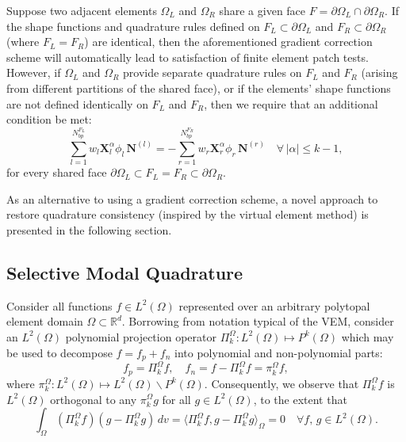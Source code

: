     	Suppose two adjacent elements $\Omega_{L}$ and $\Omega_{R}$ share a given face $F = \partial \Omega_{L} \cap \partial \Omega_{R}$. If the shape functions and quadrature rules defined on $F_L \subset \partial \Omega_L$ and $F_R \subset \partial \Omega_R$ (where $F_L = F_R$) are identical, then the aforementioned gradient correction scheme will automatically lead to satisfaction of finite element patch tests. However, if $\Omega_{L}$ and $\Omega_{R}$ provide separate quadrature rules on $F_L$ and $F_R$ (arising from different partitions of the shared face), or if the elements' shape functions are not defined identically on $F_L$ and $F_R$, then we require that an additional condition be met:
    	\begin{equation}
    		\sum_{l=1}^{N^{F_L}_{bp}} w_l \mathbf{X}^{\alpha}_l \phi_l \, \mathbf{N}^{(l)} = - \sum_{r=1}^{N^{F_R}_{bp}} w_r \mathbf{X}^{\alpha}_r \phi_r \, \mathbf{N}^{(r)} \quad \forall \, | \alpha | \leq k-1,
    	\end{equation}
    	for every shared face $\partial \Omega_L \subset F_L = F_R \subset \partial \Omega_R$.
		
	 As an alternative to using a gradient correction scheme, a novel approach to restore quadrature consistency (inspired by the virtual element method) is presented in the following section.
		
	\subsection*{Selective Modal Quadrature}
	
	Consider all functions $f \in L^2 (\Omega)$ represented over an arbitrary polytopal element domain $\Omega \subset \mathbb{R}^d$. Borrowing from notation typical of the VEM, consider an $L^2 (\Omega)$ polynomial projection operator $\Pi^{\Omega}_k : L^2 (\Omega) \mapsto P^k (\Omega)$ which may be used to decompose $f = f_p + f_n$ into polynomial and non-polynomial parts:
	\begin{equation}
		f_p = \Pi^{\Omega}_k f, \quad f_n = f - \Pi^{\Omega}_k f = \pi^{\Omega}_k f,
	\end{equation}
	where $\pi^{\Omega}_k : L^2 (\Omega) \mapsto L^2 (\Omega) \backslash P^k (\Omega)$. Consequently, we observe that $\Pi^{\Omega}_k f$ is $L^2 (\Omega)$ orthogonal to any $\pi^{\Omega}_k g$ for all $g \in L^2 (\Omega)$, to the extent that
	\begin{equation}
		\int_{\Omega} (\Pi^{\Omega}_k f) (g - \Pi^{\Omega}_k g) \, dv = \langle \Pi^{\Omega}_k f, g - \Pi^{\Omega}_k g \rangle_{\Omega} = 0 \quad \forall f, \, g \in L^2 (\Omega).
	\end{equation}
	
